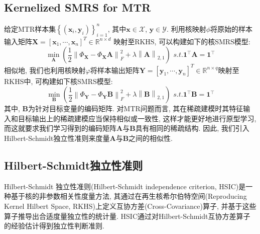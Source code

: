 \documentclass[lang=cn,10pt]{gorgeousnbook}
\numberwithin{equation}{section}%
\numberwithin{figure}{section}%
\begin{document}
 \subsection{Kernelized SMRS for MTR}
给定MTR样本集$\left\{ \left( \mathbf{x}_i,\mathbf{y}_i \right) \right\} _{i=1}^{n}$, 其中$\bm{x}\in \mathcal{X}$, $\bm{y}\in \mathcal{Y}$. 利用核映射$\phi$将原始的样本输入矩阵$\mathbf{X}=\left[ \mathbf{x}_1,\cdots,\mathbf{x}_n \right]^{T} \in \mathbb{R}^{n\times d}$ 映射至RKHS, 可以构建如下的核SMRS模型:
\begin{equation}
\min_{\boldsymbol{A}} \left( \frac{1}{2}\left\| \varPhi _{\boldsymbol{X}}-\varPhi _{\boldsymbol{X}}\boldsymbol{A} \right\| _{F}^{2}+\lambda \left\| \boldsymbol{A} \right\| _{2,1} \right) \,\,s.t.   \mathbf{1}^{\top}\boldsymbol{A}=\mathbf{1}^{\top}
\end{equation}
相似地, 我们也利用核映射$\varphi $将样本输出矩阵$\mathbf{Y} =\left[ \mathbf{y}_1,\cdots,\mathbf{y}_n\right]^{T}\in \mathbb{R}^{n\times q}$映射至RKHS中, 可构建如下核SMRS模型:
\begin{equation}
\min_{\boldsymbol{B}} \left( \frac{1}{2}\left\| \varPhi _{\boldsymbol{Y}}-\varPhi _{\boldsymbol{Y}}\boldsymbol{B} \right\| _{F}^{2}+\lambda \left\| \boldsymbol{B} \right\| _{2,1} \right) \,\,s.t.   \mathbf{1}^{\top}\boldsymbol{B}=\mathbf{1}^{\top}
\end{equation}
其中, $\bm{B}$为针对目标变量的编码矩阵. 对MTR问题而言, 其在稀疏建模时其特征输入和目标输出上的稀疏建模应当保持相似或一致性, 这样才能更好地进行原型学习, 而这就要求我们学习得到的编码矩阵$\bm{A}$与$\bm{B}$具有相同的稀疏结构. 因此, 我们引入Hilbert-Schmidt独立性准则来度量$\bm{A}$与$\bm{B}$之间的相似性. 


\subsection{Hilbert-Schmidt独立性准则}
Hilbert-Schmidt 独立性准则(Hilbert-Schmidt independence criterion, HSIC)是一种基于核的非参数相关性度量方法, 其通过在再生核希尔伯特空间(Reproducing Kernel Hilbert Space, RKHS)上定义互协方差(Cross-Covariance)算子, 并基于这些算子推导出合适度量独立性的统计量. HSIC通过对Hilbert-Schmidt互协方差算子的经验估计得到独立性判断准则.
\end{document}
